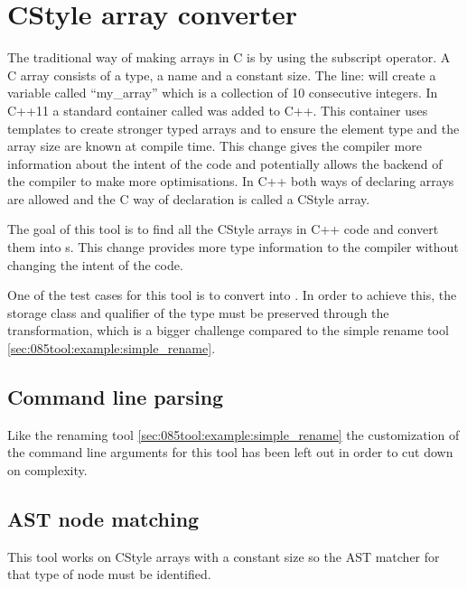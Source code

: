 
\section{CStyle array converter}\label{sec:045tool:c_style_array}

The traditional way of making arrays in C is by using the subscript operator. A C array consists of a type, a name and a constant size. The line:  will create a variable called ``my\_array'' which is a collection of 10 consecutive integers. In C++11 a standard container called  was added to C++. This container uses templates to create stronger typed arrays and to ensure the element type and the array size are known at compile time. This change gives the compiler more information about the intent of the code and potentially allows the backend of the compiler to make more optimisations. In C++ both ways of declaring arrays are allowed and the C way of declaration is called a CStyle array.

The goal of this tool is to find all the CStyle arrays in C++ code and convert them into s. This change provides more type information to the compiler without changing the intent of the code.

One of the test cases for this tool is to convert  into . In order to achieve this, the storage class and qualifier of the type must be preserved through the transformation, which is a bigger challenge compared to the simple rename tool \cref{sec:085tool:example:simple_rename}.

\subsection{Command line parsing}

Like the renaming tool \cref{sec:085tool:example:simple_rename} the customization of the command line arguments for this tool has been left out in order to cut down on complexity.

\subsection{AST node matching}\label{subsec:085tool_example:030cstyle:node_matching}

This tool works on CStyle arrays with a constant size so the AST matcher for that type of node must be identified.

